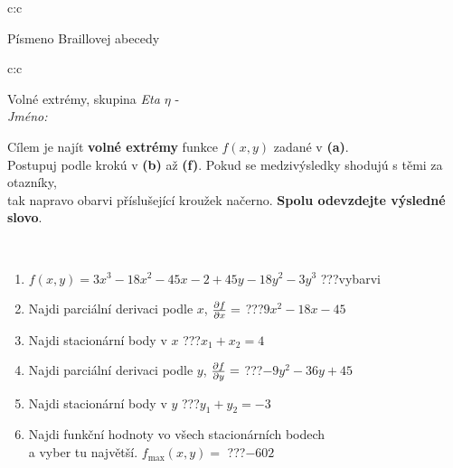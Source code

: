 \documentclass[10pt]{report}
\begin{document}
\begin{tabular}{c:c}
\begin{minipage}[c][104.5mm][t]{0.5\linewidth}
\begin{center}
\begin{minipage}{0.20\linewidth}
\begin{center}
{\small Písmeno Braillovej abecedy}
\end{center}
\end{minipage}
\end{center}
\end{minipage}
%
\end{tabular}
\newpage
\thispagestyle{empty}
\begin{tabular}{c:c}
\begin{minipage}[c][104.5mm][t]{0.5\linewidth}
\begin{center}
\vspace{7mm}
{\huge Volné extrémy, skupina \textit{Eta $\eta$} -}\\[5mm]
\textit{Jméno:}\phantom{xxxxxxxxxxxxxxxxxxxxxxxxxxxxxxxxxxxxxxxxxxxxxxxxxxxxxxxxxxxxxxxxx}\\[5mm]
\begin{minipage}{0.95\linewidth}
\begin{center}
Cílem je najít \textbf{volné extrémy} funkce $f(x,y)$ zadané v \textbf{(a)}.\\Postupuj podle krokú v \textbf{(b)} až \textbf{(f)}. Pokud se medzivýsledky shodujú s těmi za otazníky,\\tak napravo obarvi příslušející kroužek načerno. \textbf{Spolu odevzdejte výsledné slovo}.
\end{center}
\end{minipage}
\\[1mm]
\begin{minipage}{0.79\linewidth}
\begin{center}
\begin{varwidth}{\linewidth}
\begin{enumerate}
\normalsize
\item $f(x,y)=3x^3-18x^2-45x-2+45y-18y^2-3y^3$\quad \dotfill\; ???\;\dotfill \quad vybarvi
\item Najdi parciální derivaci podle $x$, $\pdv{f}{x}=$\quad \dotfill\; ???\;\dotfill \quad $9x^2-18x-45$
\item Najdi stacionární body v $x$\quad \dotfill\; ???\;\dotfill \quad $x_1+x_2=4$
\item Najdi parciální derivaci podle $y$, $\pdv{f}{y}=$\quad \dotfill\; ???\;\dotfill \quad $-9y^2-36y+45$
\item Najdi stacionární body v $y$\quad \dotfill\; ???\;\dotfill \quad $y_1+y_2=-3$
\item Najdi funkční hodnoty vo všech stacionárních bodech \\ \phantom{xxxxxx} a vyber tu najvětší. $f_{\text{max}}(x,y)=$\quad \dotfill\; ???\;\dotfill \quad $-602$

\end{enumerate}
\end{varwidth}
\end{center}
\end{minipage}
\end{center}
\end{minipage}
\end{tabular}
\end{document}
